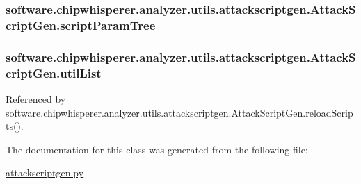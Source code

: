 \subsubsection[{script\+Param\+Tree}]{\setlength{\rightskip}{0pt plus 5cm}software.\+chipwhisperer.\+analyzer.\+utils.\+attackscriptgen.\+Attack\+Script\+Gen.\+script\+Param\+Tree}\label{classsoftware_1_1chipwhisperer_1_1analyzer_1_1utils_1_1attackscriptgen_1_1AttackScriptGen_a5776f45dde8d2add49a41994ef25e417}
\hypertarget{classsoftware_1_1chipwhisperer_1_1analyzer_1_1utils_1_1attackscriptgen_1_1AttackScriptGen_ab57bce3d46587c96e6f4942b46870944}{}
\subsubsection[{util\+List}]{\setlength{\rightskip}{0pt plus 5cm}software.\+chipwhisperer.\+analyzer.\+utils.\+attackscriptgen.\+Attack\+Script\+Gen.\+util\+List}\label{classsoftware_1_1chipwhisperer_1_1analyzer_1_1utils_1_1attackscriptgen_1_1AttackScriptGen_ab57bce3d46587c96e6f4942b46870944}


Referenced by software.\+chipwhisperer.\+analyzer.\+utils.\+attackscriptgen.\+Attack\+Script\+Gen.\+reload\+Scripts().



The documentation for this class was generated from the following file\+:\begin{DoxyCompactItemize}
\item 
\hyperlink{attackscriptgen_8py}{attackscriptgen.\+py}\end{DoxyCompactItemize}
